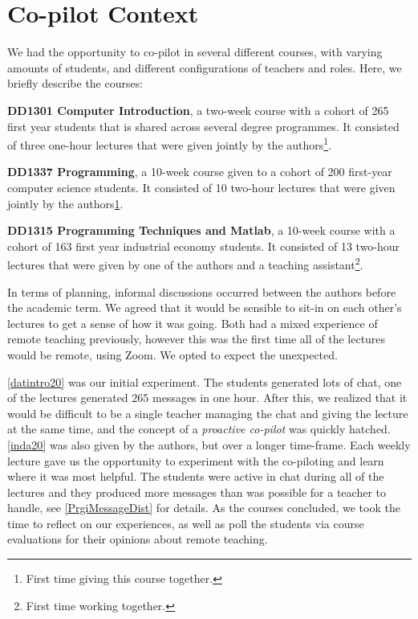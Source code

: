 \documentclass[sigconf,natbib=false]{acmart}
\begin{document}
\section{Co-pilot Context}
We had the opportunity to co-pilot in several different courses, with varying amounts of students, and different configurations of teachers and roles. Here, we briefly describe the courses:

\begin{courses}
  \item\label{datintro20} \textbf{DD1301 Computer Introduction}, a two-week 
    course with a cohort of 265 first year students that is shared across 
    several degree programmes. It consisted of three one-hour lectures that 
    were given jointly by the authors\footnote{\label{first-together}First time 
    giving this course together.}.

  \item\label{inda20} \textbf{DD1337 Programming}, a 10-week course given to a 
    cohort of 200 first-year computer science students. It consisted of 10 
    two-hour lectures that were given jointly by the 
    authors\cref{first-together}.

  \item\label{prgi20} \textbf{DD1315 Programming Techniques and Matlab}, a 
    10-week course with a cohort of 163 first year industrial economy students. 
    It consisted of 13 two-hour lectures that were given by one of the authors 
    and a teaching assistant\footnote{First time working together.}.
\end{courses}

In terms of planning, informal discussions occurred between the authors before the academic term. We agreed that it would be sensible to sit-in on each other's lectures to get a sense of how it was going. Both had a mixed experience of remote teaching previously, however this was the first time all of the  lectures would be remote, using Zoom. We opted to expect the unexpected.

\ref{datintro20} was our initial experiment. The students generated lots of 
chat, \eg one of the lectures generated $265$ messages in one hour. After this, 
we realized that it would be difficult to be a single teacher managing the chat 
and giving the lecture at the same time, and the concept of a \emph{proactive 
co-pilot} was quickly hatched. \ref{inda20} was also given by the authors, but 
over a longer time-frame. Each weekly lecture gave us the opportunity to 
experiment with the co-piloting and learn where it was most helpful. The 
students were active in chat during all of the lectures and they produced more 
messages than was possible for a teacher to handle, see \cref{PrgiMessageDist} 
for details. As the courses concluded, we took the time to reflect on our 
experiences, as well as poll the students via course evaluations for their 
opinions about remote teaching.
\end{document}
